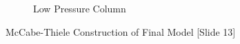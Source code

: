 \begin{figure}[ht]
\begin{subfigure}{0.49\textwidth}
            \caption{Low Pressure Column}
            \label{fig:LPC_v1}
        \end{subfigure}
        \caption{McCabe-Thiele Construction of Final Model [Slide 13]}
        \label{fig:mccabe_v1}
    \end{figure}
    
%